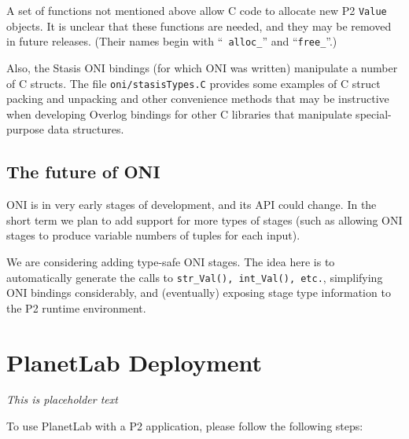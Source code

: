 \documentclass{article}
\begin{document}
A set of functions not mentioned above allow C code to allocate new P2
{\tt Value} objects.  It is unclear that these functions are needed, and
they may be removed in future releases. (Their names begin with ``{\tt
  alloc\_}'' and ``{\tt free\_}''.)  

Also, the Stasis ONI bindings (for which ONI was written) manipulate a
number of C structs.  The file {\tt oni/stasisTypes.C} provides some
examples of C struct packing and unpacking and other convenience
methods that may be instructive when developing Overlog bindings for
other C libraries that manipulate special-purpose data structures.

\subsection{The future of ONI}

ONI is in very early stages of development, and its API could change.
In the short term we plan to add support for more types of stages
(such as allowing ONI stages to produce variable numbers of tuples for
each input).

We are considering adding type-safe ONI stages.  The idea here is to
automatically generate the calls to {\tt str\_Val(), int\_Val(),
  etc.}, simplifying ONI bindings considerably, and (eventually)
exposing stage type information to the P2 runtime environment.

\section{PlanetLab Deployment}
\emph{This is placeholder text}

To use PlanetLab with a P2 application, please follow the following steps:
\end{document}
